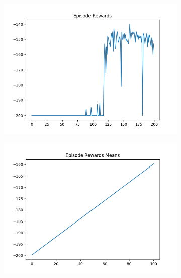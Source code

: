 \begin{figure}[H]
\begin{subfigure}{.47\linewidth}
        \includegraphics[width=\textwidth]{mountain/2024-06-15_13-39-22_dqn_mountaincar_episode_rewards.png}
    \end{subfigure}
    \begin{subfigure}{.47\linewidth}
        \centering
        \includegraphics[width=\textwidth]{mountain/2024-06-15_13-39-22_dqn_mountaincar_episode_rewards_means.png}
    \end{subfigure}
\end{figure}
